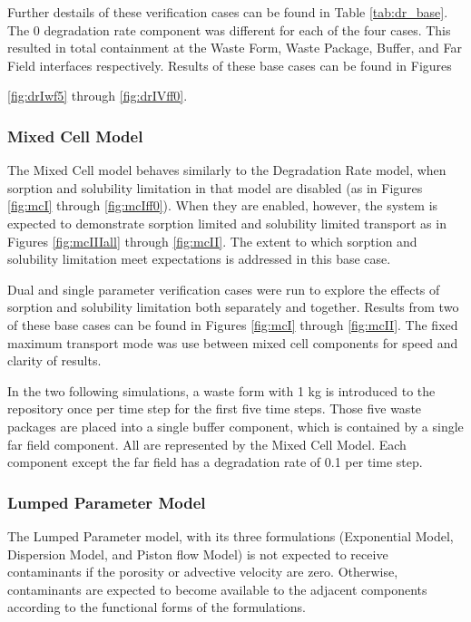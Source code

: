Further destails of these verification 
cases can be found in Table \ref{tab:dr_base}. The 0 degradation rate component was 
different for each of the four cases. This resulted in total containment at the 
Waste Form, Waste Package, Buffer, and Far Field interfaces respectively. 
Results of these base cases can be found in Figures 

\ref{fig:drIwf5} through \ref{fig:drIVff0}.
\FloatBarrier


\FloatBarrier

\subsubsection{Mixed Cell Model}
The Mixed Cell model behaves similarly to the Degradation Rate model, when 
sorption and solubility limitation in that model are disabled (as in Figures 
\ref{fig:mcI} through \ref{fig:mcIff0}). When they are enabled, however, the 
system is expected to demonstrate sorption limited and solubility limited 
transport as in Figures \ref{fig:mcIIIall} through \ref{fig:mcII}. The extent 
to which sorption and solubility limitation meet expectations is addressed in 
this base case.  

Dual and single parameter verification cases were run to explore the effects of 
sorption and solubility limitation both separately and together.  Results from 
two of these base cases can be found in Figures \ref{fig:mcI} through 
\ref{fig:mcII}.
The fixed maximum transport mode was use between mixed cell components for speed 
and clarity of results.

In the two following simulations, a waste form with 1 kg is introduced to the repository once 
per time step for the first five time steps. Those five waste packages are 
placed into a single buffer component, which is contained by a single far field 
component. All are represented by the Mixed Cell Model. Each component except 
the far field has a degradation rate of 0.1 per time step.


\FloatBarrier

\subsubsection{Lumped Parameter Model}

The Lumped Parameter model, with its three formulations (Exponential Model, 
Dispersion Model, and Piston flow Model) is not expected to receive 
contaminants if the porosity or advective velocity are zero. Otherwise, 
contaminants are expected to  become available to the adjacent components 
according to the functional forms of the formulations. 

